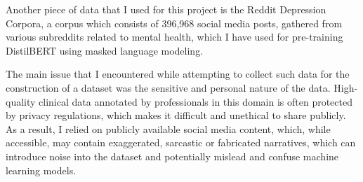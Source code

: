 Another piece of data that I used for this project is the Reddit Depression Corpora, a corpus which consists of 396,968 social media posts, gathered from various subreddits related to mental health, which I have used for pre-training DistilBERT using masked language modeling.

The main issue that I encountered while attempting to collect such data for the construction of a dataset was the sensitive and personal nature of the data. High-quality clinical data annotated by professionals in this domain is often protected by privacy regulations, which makes it difficult and unethical to share publicly. As a result, I relied on publicly available social media content, which, while accessible, may contain exaggerated, sarcastic or fabricated narratives, which can introduce noise into the dataset and potentially mislead and confuse machine learning models.
